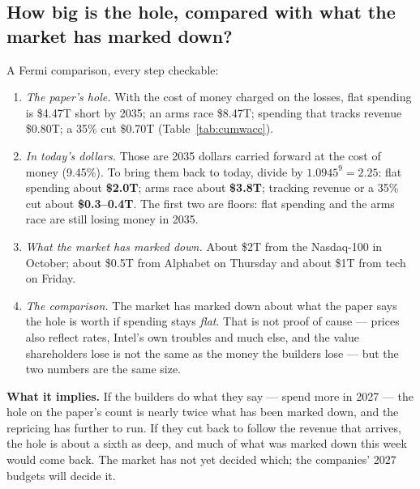 \documentclass[11pt,letterpaper]{article}
\begin{document}
\subsection*{How big is the hole, compared with what the market has marked down?}\label{news:size}
A Fermi comparison, every step checkable:
\begin{enumerate}
\item \emph{The paper's hole.} With the cost of money charged on the losses, flat spending is \$4.47T short by 2035; an arms race \$8.47T; spending that tracks revenue \$0.80T; a 35\% cut \$0.70T (Table~\ref{tab:cumwacc}).
\item \emph{In today's dollars.} Those are 2035 dollars carried forward at the cost of money (9.45\%). To bring them back to today, divide by $1.0945^{9}=2.25$: flat spending about \textbf{\$2.0T}; arms race about \textbf{\$3.8T}; tracking revenue or a 35\% cut about \textbf{\$0.3--0.4T}. The first two are floors: flat spending and the arms race are still losing money in 2035.
\item \emph{What the market has marked down.} About \$2T from the Nasdaq-100 in October; about \$0.5T from Alphabet on Thursday and about \$1T from tech on Friday.
\item \emph{The comparison.} The market has marked down about what the paper says the hole is worth if spending stays \emph{flat}. That is not proof of cause --- prices also reflect rates, Intel's own troubles and much else, and the value shareholders lose is not the same as the money the builders lose --- but the two numbers are the same size.
\end{enumerate}
\noindent\textbf{What it implies.} If the builders do what they say --- spend more in 2027 --- the hole on the paper's count is nearly twice what has been marked down, and the repricing has further to run. If they cut back to follow the revenue that arrives, the hole is about a sixth as deep, and much of what was marked down this week would come back. The market has not yet decided which; the companies' 2027 budgets will decide it.
\end{document}
